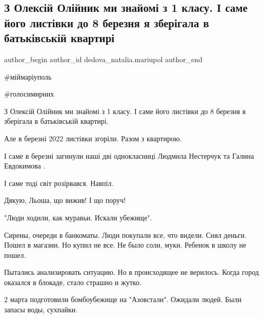  
 
 
 
 

\subsection{З Олексій Олійник ми знайомі з 1 класу. І саме його листівки до 8 березня я зберігала в батьківській квартирі}
\label{sec:17_04_2023.fb.dedova_natalia.mariupol.1.oleksij_olijnyk_djakuju_ljosha}

\ifcmt
 author_begin
   author_id dedova_natalia.mariupol
 author_end
\fi

\#міймаріуполь

\#голосимирних

З Олексій Олійник ми знайомі з 1 класу. І саме його листівки до 8 березня я
зберігала в батьківській квартирі. 

Але в березні 2022 листівки згоріли. Разом з квартирою. 

І саме в березні загинули наші дві однокласниці Людмила Нестерчук та Галина
Евдокимова . 

І саме тоді світ розірвався. Навпіл. 

Дякую, Льоша, що вижив! І що поруч! 

"Люди ходили, как муравьи. Искали убежище". 

Сирены, очереди в банкоматы. Люди покупали все, что видели. Снял деньги. Пошел
в магазин. Но купил не все. Не было соли, муки. Ребенок в школу не пошел. 

Пытались анализировать ситуацию. Но в происходящее не верилось. Когда город
оказался в блокаде, стало страшно и жутко. 

2 марта подготовили бомбоубежище на "Азовстали". Ожидали людей. Были запасы
воды, сухпайки. 

